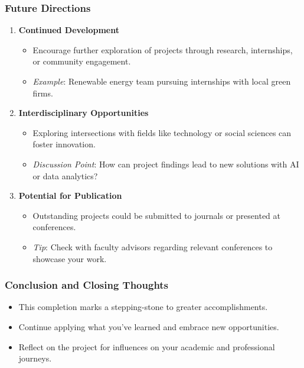 \documentclass{beamer}
\begin{document}
\begin{frame}[fragile]
    \frametitle{Future Directions}
    \begin{enumerate}
        \item \textbf{Continued Development}
            \begin{itemize}
                \item Encourage further exploration of projects through research, internships, or community engagement.
                \item \textit{Example}: Renewable energy team pursuing internships with local green firms.
            \end{itemize}
        
        \item \textbf{Interdisciplinary Opportunities}
            \begin{itemize}
                \item Exploring intersections with fields like technology or social sciences can foster innovation.
                \item \textit{Discussion Point}: How can project findings lead to new solutions with AI or data analytics?
            \end{itemize}
        
        \item \textbf{Potential for Publication}
            \begin{itemize}
                \item Outstanding projects could be submitted to journals or presented at conferences.
                \item \textit{Tip}: Check with faculty advisors regarding relevant conferences to showcase your work.
            \end{itemize}
    \end{enumerate}
\end{frame}

\begin{frame}[fragile]
    \frametitle{Conclusion and Closing Thoughts}
    \begin{itemize}
        \item This completion marks a stepping-stone to greater accomplishments.
        \item Continue applying what you’ve learned and embrace new opportunities.
        \item Reflect on the project for influences on your academic and professional journeys.
    \end{itemize}
\end{frame}
\end{document}
